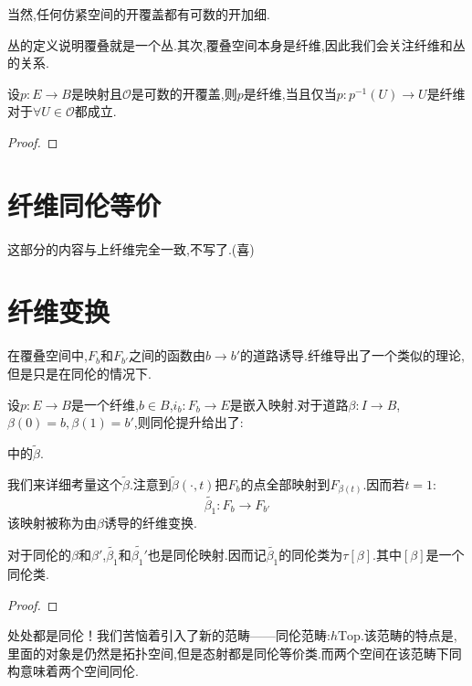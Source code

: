 当然,任何仿紧空间的开覆盖都有可数的开加细.

丛的定义说明覆叠就是一个丛.其次,覆叠空间本身是纤维,因此我们会关注纤维和丛的关系.
\begin{theorem}
    设$p:E \to B$是映射且$\mathcal{O}$是可数的开覆盖,则$p$是纤维,当且仅当$p:p^{-1}(U)\to U$是纤维对于$\forall U \in \mathcal{O}$都成立.
\end{theorem}
\begin{proof}
    
\end{proof}
\section{纤维同伦等价}
这部分的内容与上纤维完全一致,不写了.(喜)
\section{纤维变换}
在覆叠空间中,$F_b$和$F_{b'}$之间的函数由$b \to b'$的道路诱导.纤维导出了一个类似的理论,但是只是在同伦的情况下.

设$p:E \to B$是一个纤维,$b \in B$,$i_b:F_b \to E$是嵌入映射.对于道路$\beta:I \to B$,$\beta(0)=b,\beta(1)=b'$,则同伦提升给出了:
中的$\tilde{\beta}$.

我们来详细考量这个$\tilde{\beta}$.注意到$\tilde{\beta}(\cdot,t)$把$F_b$的点全部映射到$F_{\beta(t)}$.因而若$t=1$:
$$
\tilde{\beta_1}:F_b \to F_{b'}
$$
该映射被称为由$\beta$诱导的纤维变换.

\begin{proposition}
    对于同伦的$\beta$和$\beta'$,$\tilde{\beta_1}$和$\tilde{\beta_1'}$也是同伦映射.因而记$\tilde{\beta_1}$的同伦类为$\tau[\beta]$.其中$[\beta]$是一个同伦类.
\end{proposition}
\begin{proof}
    
\end{proof}

处处都是同伦！我们苦恼着引入了新的范畴——同伦范畴:$h\mathrm{Top}$.该范畴的特点是,里面的对象是仍然是拓扑空间,但是态射都是同伦等价类.而两个空间在该范畴下同构意味着两个空间同伦.

